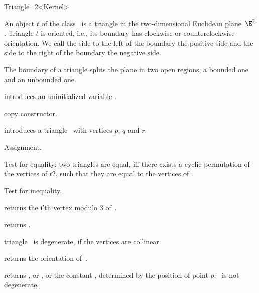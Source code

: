 \begin{ccRefClass} {Triangle_2<Kernel>}

\ccDefinition  An object $t$ of the class \ccRefName\ is a triangle 
in the two-dimensional Euclidean plane~$\E^2$. 
Triangle  $t$  is oriented, i.e., its boundary has
clockwise or counterclockwise orientation. We call the side to the left
of the boundary the positive side and the side to the right of the
boundary the negative side.

The boundary of a triangle splits the plane in
two open regions, a bounded one and an unbounded one. 

\ccCreation
{}


\ccHidden {}
             {introduces an uninitialized variable \ccVar.}

\ccHidden {}
 	    {copy constructor.}


            {introduces a triangle \ccVar\ with vertices $p$,  $q$ and $r$.}


\ccOperations

\ccHidden {}
        {Assignment.}

       {Test for equality: two triangles are equal, iff there exists a 
        cyclic permutation of the vertices of $t2$, such that they are 
        equal to the vertices of \ccVar.}

       {Test for inequality.}

       {returns the i'th vertex modulo 3  of~\ccVar.}

       {returns .}

\ccPredicates

       {triangle \ccVar\ is degenerate, if the vertices are collinear.}

       {returns the orientation of~\ccVar.}

       {returns 
        , or
        , 
        or the constant
        ,
        determined by the position of point $p$.
        \ccPrecond \ccVar\ is not degenerate.}


\end{ccRefClass}
